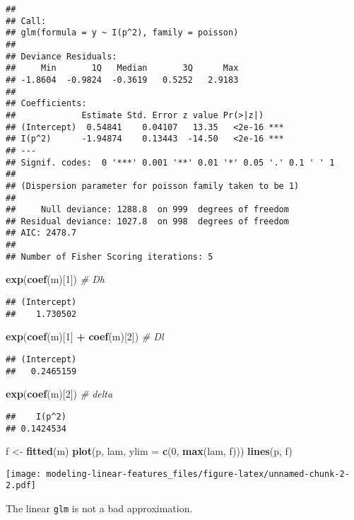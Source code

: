 \documentclass[]{article}
\newenvironment{Shaded}{\begin{snugshade}}{\end{snugshade}}
\newcommand{\KeywordTok}[1]{\textcolor[rgb]{0.13,0.29,0.53}{\textbf{#1}}}
\newcommand{\DataTypeTok}[1]{\textcolor[rgb]{0.13,0.29,0.53}{#1}}
\newcommand{\DecValTok}[1]{\textcolor[rgb]{0.00,0.00,0.81}{#1}}
\newcommand{\StringTok}[1]{\textcolor[rgb]{0.31,0.60,0.02}{#1}}
\newcommand{\CommentTok}[1]{\textcolor[rgb]{0.56,0.35,0.01}{\textit{#1}}}
\newcommand{\OperatorTok}[1]{\textcolor[rgb]{0.81,0.36,0.00}{\textbf{#1}}}
\newcommand{\NormalTok}[1]{#1}
\begin{document}
\begin{verbatim}
## 
## Call:
## glm(formula = y ~ I(p^2), family = poisson)
## 
## Deviance Residuals: 
##     Min       1Q   Median       3Q      Max  
## -1.8604  -0.9824  -0.3619   0.5252   2.9183  
## 
## Coefficients:
##             Estimate Std. Error z value Pr(>|z|)    
## (Intercept)  0.54841    0.04107   13.35   <2e-16 ***
## I(p^2)      -1.94874    0.13443  -14.50   <2e-16 ***
## ---
## Signif. codes:  0 '***' 0.001 '**' 0.01 '*' 0.05 '.' 0.1 ' ' 1
## 
## (Dispersion parameter for poisson family taken to be 1)
## 
##     Null deviance: 1288.8  on 999  degrees of freedom
## Residual deviance: 1027.8  on 998  degrees of freedom
## AIC: 2478.7
## 
## Number of Fisher Scoring iterations: 5
\end{verbatim}

\begin{Shaded}
\begin{Highlighting}[]
\KeywordTok{exp}\NormalTok{(}\KeywordTok{coef}\NormalTok{(m)[}\DecValTok{1}\NormalTok{]) }\CommentTok{# Dh}
\end{Highlighting}
\end{Shaded}

\begin{verbatim}
## (Intercept) 
##    1.730502
\end{verbatim}

\begin{Shaded}
\begin{Highlighting}[]
\KeywordTok{exp}\NormalTok{(}\KeywordTok{coef}\NormalTok{(m)[}\DecValTok{1}\NormalTok{] }\OperatorTok{+}\StringTok{ }\KeywordTok{coef}\NormalTok{(m)[}\DecValTok{2}\NormalTok{]) }\CommentTok{# Dl}
\end{Highlighting}
\end{Shaded}

\begin{verbatim}
## (Intercept) 
##   0.2465159
\end{verbatim}

\begin{Shaded}
\begin{Highlighting}[]
\KeywordTok{exp}\NormalTok{(}\KeywordTok{coef}\NormalTok{(m)[}\DecValTok{2}\NormalTok{]) }\CommentTok{# delta}
\end{Highlighting}
\end{Shaded}

\begin{verbatim}
##    I(p^2) 
## 0.1424534
\end{verbatim}

\begin{Shaded}
\begin{Highlighting}[]
\NormalTok{f <-}\StringTok{ }\KeywordTok{fitted}\NormalTok{(m)}
\KeywordTok{plot}\NormalTok{(p, lam, }\DataTypeTok{ylim =} \KeywordTok{c}\NormalTok{(}\DecValTok{0}\NormalTok{, }\KeywordTok{max}\NormalTok{(lam, f)))}
\KeywordTok{lines}\NormalTok{(p, f)}
\end{Highlighting}
\end{Shaded}

\texttt{[image: modeling-linear-features\_files/figure-latex/unnamed-chunk-2-2.pdf]}

The linear \texttt{glm} is not a bad approximation.
\end{document}
